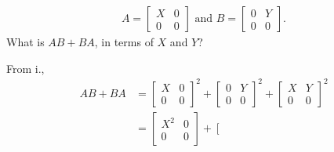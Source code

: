 \documentclass[a4paper,12pt]{article}
\begin{document}
\begin{enumerate}
\begin{enumerate}
\begin{enumerate}
{\begin{align*}
                                A = \left[ \begin{array}{cc}
                                        X & 0 \\
                                        0 & 0
                                \end{array} \right]
                                \text{ and }
                                B = \left[ \begin{array}{cc}
                                        0 & Y \\
                                        0 & 0
                                \end{array} \right].
                            \end{align*}
                            What is $AB + BA$, in terms of $X$ and $Y$?
                            }\unboldmath \par
                            From i.,
                            \begin{align*}
                                AB + BA &=
                                \left[ \begin{array}{cc}
                                        X & 0 \\
                                        0 & 0
                                \end{array} \right]^2
                                +
                                \left[ \begin{array}{cc}
                                        0 & Y \\
                                        0 & 0
                                \end{array} \right]^2
                                +
                                \left[ \begin{array}{cc}
                                        X & Y \\
                                        0 & 0
                                \end{array} \right]^2 \\
                                &=
                                \left[ \begin{array}{cc}
                                        X^2 & 0 \\
                                        0 & 0
                                \end{array} \right]
                                +
                                \left[ \begin{array}{cc}

\end{array}
\end{align*}
\end{enumerate}
\end{enumerate}
\end{enumerate}
\end{document}
